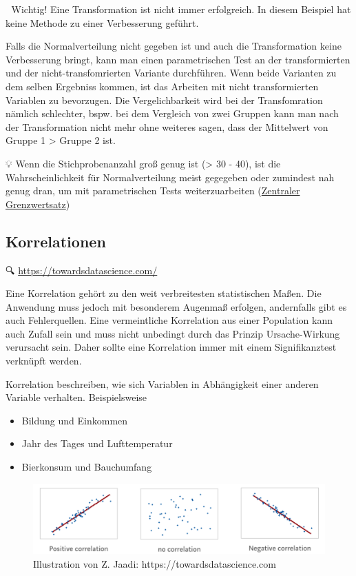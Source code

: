 \documentclass[
]{article}
\providecommand{\tightlist}{%
  \setlength{\itemsep}{0pt}\setlength{\parskip}{0pt}}
\begin{document}
🚨 Wichtig! Eine Transformation ist nicht immer erfolgreich. In diesem Beispiel hat keine Methode zu einer Verbesserung geführt.

Falls die Normalverteilung nicht gegeben ist und auch die Transformation keine Verbesserung bringt, kann man einen parametrischen Test an der transformierten und der nicht-transfomrierten Variante durchführen. Wenn beide Varianten zu dem selben Ergebniss kommen, ist das Arbeiten mit nicht transformierten Variablen zu bevorzugen. Die Vergelichbarkeit wird bei der Transfomration nämlich schlechter, bspw. bei dem Vergleich von zwei Gruppen kann man nach der Transformation nicht mehr ohne weiteres sagen, dass der Mittelwert von Gruppe 1 \textgreater{} Gruppe 2 ist.

💡 Wenn die Stichprobenanzahl groß genug ist (\textgreater{} 30 - 40), ist die Wahrscheinlichkeit für Normalverteilung meist gegegeben oder zumindest nah genug dran, um mit parametrischen Tests weiterzuarbeiten (\href{https://de.wikipedia.org/wiki/Zentraler_Grenzwertsatz}{Zentraler Grenzwertsatz})

\hypertarget{korrelationen}{%
\subsection{Korrelationen}\label{korrelationen}}

🔍 \href{https://towardsdatascience.com/eveything-you-need-to-know-about-interpreting-correlations-2c485841c0b8}{https://towardsdatascience.com/}

Eine Korrelation gehört zu den weit verbreitesten statistischen Maßen. Die Anwendung muss jedoch mit besonderem Augenmaß erfolgen, andernfalls gibt es auch Fehlerquellen. Eine vermeintliche Korrelation aus einer Population kann auch Zufall sein und muss nicht unbedingt durch das Prinzip Ursache-Wirkung verursacht sein. Daher sollte eine Korrelation immer mit einem Signifikanztest verknüpft werden.

Korrelation beschreiben, wie sich Variablen in Abhängigkeit einer anderen Variable verhalten. Beispielsweise

\begin{itemize}
\tightlist
\item
  Bildung und Einkommen
\item
  Jahr des Tages und Lufttemperatur
\item
  Bierkonsum und Bauchumfang
\end{itemize}

\begin{figure}

{\centering \includegraphics[width=8.35in]{images/055} 

}

\caption{Illustration von Z. Jaadi: https://towardsdatascience.com}\label{fig:unnamed-chunk-258}
\end{figure}
\end{document}
